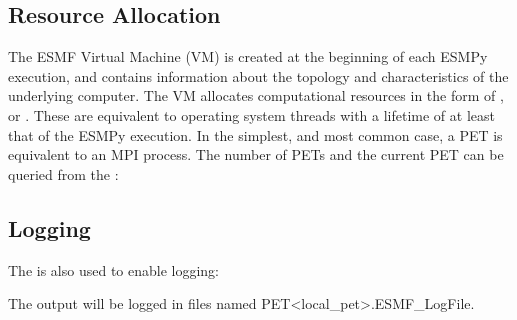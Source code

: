 \documentclass[letterpaper,10pt,english]{sphinxmanual}
\begin{document}
\subsection{Resource Allocation}
\label{\detokenize{api:resource-allocation}}
The ESMF Virtual Machine (VM) 
is created at the beginning of each ESMPy execution, and contains information
about the topology and characteristics of the underlying computer. The VM
allocates computational resources in the form of
, or . These are equivalent to operating
system threads with a lifetime of at least that of the ESMPy execution. In the
simplest, and most common case, a PET is equivalent to an MPI process. The
number of PETs and the current PET can be queried from the
{\hyperref[\detokenize{manager:ESMF.api.esmpymanager.Manager}]{}}:

\begin{sphinxVerbatim}[commandchars=\\\{\}]
  
  
  
\end{sphinxVerbatim}


\subsection{Logging}
\label{\detokenize{api:logging}}
The {\hyperref[\detokenize{manager:ESMF.api.esmpymanager.Manager}]{}} is also used to enable logging:

\begin{sphinxVerbatim}[commandchars=\\\{\}]
  
  
\end{sphinxVerbatim}

The output will be logged in files named PET\textless{}local\_pet\textgreater{}.ESMF\_LogFile.
\end{document}
